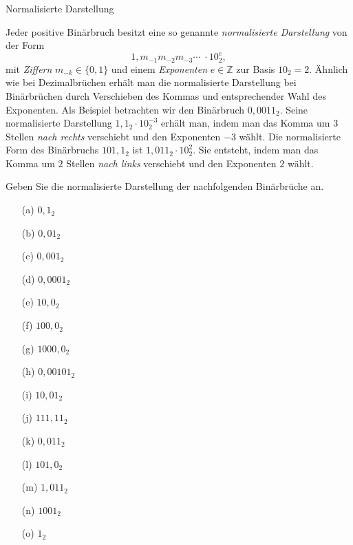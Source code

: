 \begin{exercise}{Normalisierte Darstellung}

\begin{body}
Jeder positive Binärbruch besitzt eine so genannte \emph{normalisierte Darstellung} von der Form
\[  1{,}m_{-1}m_{-2}m_{-3}\dotsm\; \cdot 10_2^e,   \]
mit \emph{Ziffern} $m_{-k} \in \{0,1\}$ und einem \emph{Exponenten} $e \in \mathbb{Z}$ zur Basis $10_2 = 2$. Ähnlich wie bei Dezimalbrüchen erhält man die normalisierte Darstellung bei Binärbrüchen durch Verschieben des Kommas und entsprechender Wahl des Exponenten. Als Beispiel betrachten wir den Binärbruch $0{,}0011_2$. Seine normalisierte Darstellung $1{,}1_2 \cdot 10_2^{-3}$ erhält man, indem man das Komma um $3$ Stellen \emph{nach rechts} verschiebt und den Exponenten $-3$ wählt. Die normalisierte Form des Binärbruchs $101{,}1_2$ ist $1{,}011_2 \cdot 10_2^{2}$. Sie entsteht, indem man das Komma um $2$ Stellen \emph{nach links} verschiebt und den Exponenten $2$ wählt.  

Geben Sie die normalisierte Darstellung der nachfolgenden Binärbrüche an.
\begin{center}
\begin{minipage}{0.3\textwidth}
\begin{itemize}
\item[(a)] $0{,}1_2$
\item[(b)] $0{,}01_2$
\item[(c)] $0{,}001_2$
\item[(d)] $0{,}0001_2$
\item[(e)] $10{,}0_2$
\end{itemize}
\end{minipage}
\begin{minipage}{0.3\textwidth}
\begin{itemize}
\item[(f)] $100{,}0_2$
\item[(g)] $1000{,}0_2$
\item[(h)] $0{,}00101_2$
\item[(i)] $10{,}01_2$
\item[(j)] $111{,}11_2$
\end{itemize}
\end{minipage}
\begin{minipage}{0.3\textwidth}
\begin{itemize}
\item[(k)] $0{,}011_2$
\item[(l)] $101{,}0_2$
\item[(m)] $1{,}011_2$
\item[(n)] $1001_2$
\item[(o)] $1_2$
\end{itemize}
\end{minipage}
\end{center}
\end{body}


\end{exercise}
